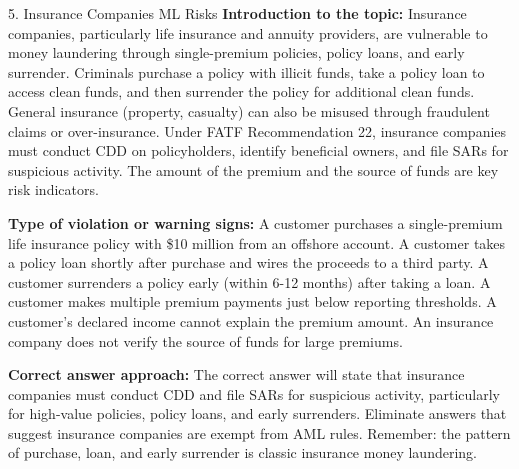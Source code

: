 \documentclass[11pt,a4paper]{beamer}
\begin{document}
\begin{frame}{5. Insurance Companies ML Risks}
\tiny
\noindent\textbf{Introduction to the topic:} Insurance companies, particularly life insurance and annuity providers, are vulnerable to money laundering through single-premium policies, policy loans, and early surrender. Criminals purchase a policy with illicit funds, take a policy loan to access clean funds, and then surrender the policy for additional clean funds. General insurance (property, casualty) can also be misused through fraudulent claims or over-insurance. Under FATF Recommendation 22, insurance companies must conduct CDD on policyholders, identify beneficial owners, and file SARs for suspicious activity. The amount of the premium and the source of funds are key risk indicators.

\vspace{0.1cm}
\noindent\textbf{Type of violation or warning signs:} A customer purchases a single-premium life insurance policy with \$10 million from an offshore account. A customer takes a policy loan shortly after purchase and wires the proceeds to a third party. A customer surrenders a policy early (within 6-12 months) after taking a loan. A customer makes multiple premium payments just below reporting thresholds. A customer's declared income cannot explain the premium amount. An insurance company does not verify the source of funds for large premiums.

\vspace{0.1cm}
\noindent\textbf{Correct answer approach:} The correct answer will state that insurance companies must conduct CDD and file SARs for suspicious activity, particularly for high-value policies, policy loans, and early surrenders. Eliminate answers that suggest insurance companies are exempt from AML rules. Remember: the pattern of purchase, loan, and early surrender is classic insurance money laundering.
\end{frame}
\end{document}
